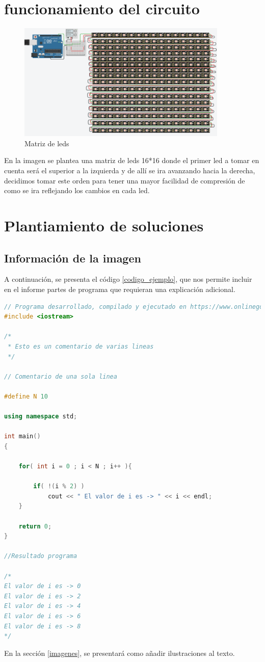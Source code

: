 \documentclass{article}
\begin{document}
\section{funcionamiento del circuito} \label{contenido}

\begin{figure}[h]
\includegraphics[width=10cm]{Simulación.png}
\centering
\caption{Matriz de leds}
\label{fig:matriz de leds}
\end{figure}
\label{contenido}
En la imagen se plantea una matriz de leds 16*16 donde el primer led a tomar en cuenta será el superior a la izquierda y de allí se ira avanzando hacia la derecha, decidimos tomar este orden para tener una mayor facilidad de compresión de como se ira reflejando los cambios en cada led.



\section{Plantiamiento de soluciones }

\subsection{Información de la imagen  }

A continuación, se presenta el código \ref{codigo_ejemplo}, que nos permite incluir en el informe partes de programa que requieran una explicación adicional.
\begin{lstlisting}[language=C++, label=codigo_ejemplo]
// Programa desarrollado, compilado y ejecutado en https://www.onlinegdb.com
#include <iostream>

/*
 * Esto es un comentario de varias lineas
 */

// Comentario de una sola linea

#define N 10

using namespace std;

int main()
{
    
    for( int i = 0 ; i < N ; i++ ){
        
        if( !(i % 2) )
            cout << " El valor de i es -> " << i << endl;
    }
    
    return 0;
}

//Resultado programa

/*
El valor de i es -> 0
El valor de i es -> 2
El valor de i es -> 4
El valor de i es -> 6
El valor de i es -> 8
*/
\end{lstlisting}
En la sección \ref{imagenes}, se presentará como añadir ilustraciones al texto.
\end{document}
